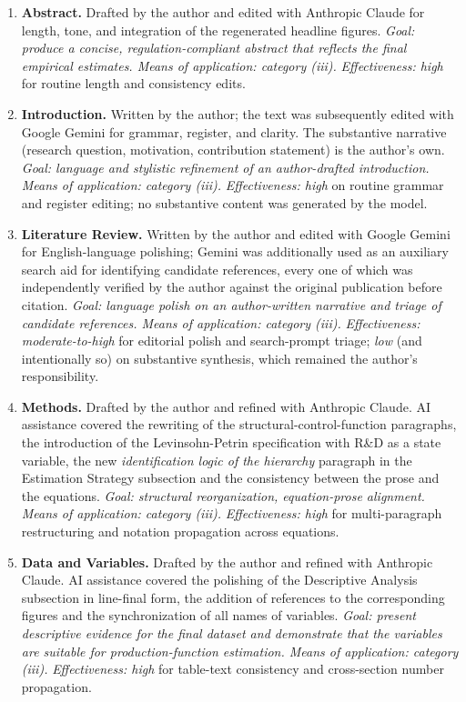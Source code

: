 \documentclass[a4paper, 12pt]{article}
\begin{document}
\begin{enumerate}
    \item \textbf{Abstract.} Drafted by the author and edited with Anthropic Claude for length, tone, and integration of the regenerated headline figures. \emph{Goal: produce a concise, regulation-compliant abstract that reflects the final empirical estimates. Means of application: category (iii).} \emph{Effectiveness: high} for routine length and consistency edits.

    \item \textbf{Introduction.} Written by the author; the text was subsequently edited with Google Gemini for grammar, register, and clarity. The substantive narrative (research question, motivation, contribution statement) is the author's own. \emph{Goal: language and stylistic refinement of an author-drafted introduction. Means of application: category (iii).} \emph{Effectiveness: high} on routine grammar and register editing; no substantive content was generated by the model.

    \item \textbf{Literature Review.} Written by the author and edited with Google Gemini for English-language polishing; Gemini was additionally used as an auxiliary search aid for identifying candidate references, every one of which was independently verified by the author against the original publication before citation. \emph{Goal: language polish on an author-written narrative and triage of candidate references. Means of application: category (iii).} \emph{Effectiveness: moderate-to-high} for editorial polish and search-prompt triage; \emph{low} (and intentionally so) on substantive synthesis, which remained the author's responsibility.

    \item \textbf{Methods.} Drafted by the author and refined with Anthropic Claude. AI assistance covered the rewriting of the structural-control-function paragraphs, the introduction of the Levinsohn-Petrin specification with R\&D as a state variable, the new \emph{identification logic of the hierarchy} paragraph in the Estimation Strategy subsection and the consistency between the prose and the equations. \emph{Goal: structural reorganization, equation-prose alignment. Means of application: category (iii).} \emph{Effectiveness: high} for multi-paragraph restructuring and notation propagation across equations.

    \item \textbf{Data and Variables.} Drafted by the author and refined with Anthropic Claude. AI assistance covered the polishing of the Descriptive Analysis subsection in line-final form, the addition of references to the corresponding figures and the synchronization of all names of variables. \emph{Goal: present descriptive evidence for the final dataset and demonstrate that the variables are suitable for production-function estimation. Means of application: category (iii).} \emph{Effectiveness: high} for table-text consistency and cross-section number propagation.


\end{enumerate}
\end{document}
